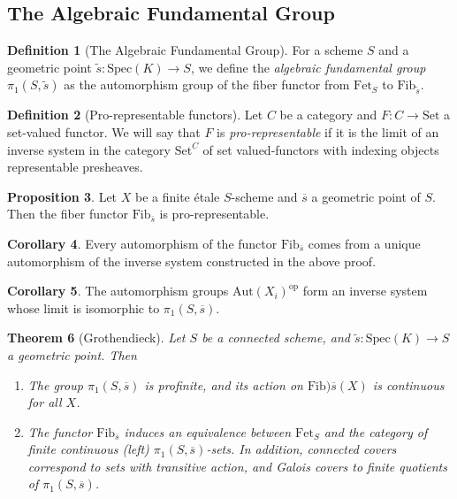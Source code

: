 \documentclass{article}
\newtheorem{theorem}{Theorem}[section]
\theoremstyle{definition}
\newtheorem{corollary}[theorem]{Corollary}
\newtheorem{proposition}[theorem]{Proposition}
\newtheorem{definition}[theorem]{Definition}
\theoremstyle{remark}
\begin{document}
\subsection{The Algebraic Fundamental Group}


\begin{definition}[The Algebraic Fundamental Group]
	For a scheme $S$ and a geometric point $\widetilde{s}: \text{Spec}(K) \to S$, we define the \textit{algebraic fundamental group} $\pi_1(S, \widetilde{s})$ as the automorphism group of the fiber functor from $\text{Fet}_{S}$ to $\text{Fib}_{\widetilde{s}}$.
\end{definition}

\begin{definition}[Pro-representable functors]
	Let $C$ be a category and $F: C \to \text{Set}$ a set-valued functor.
	We will say that $F$ is \textit{pro-representable} if it is the limit of an inverse system in the category $\text{Set}^C$ of set valued-functors with indexing objects representable presheaves.
\end{definition} 

\begin{proposition}
	Let $X$ be a finite \'etale $S$-scheme and $\overline{s}$ a geometric point of $S$.
	Then the fiber functor $\text{Fib}_{\overline{s}}$ is pro-representable.
\end{proposition}

\begin{corollary}
	Every automorphism of the functor $\text{Fib}_{\overline{s}}$ comes from a unique automorphism of the inverse system constructed in the above proof.
\end{corollary}

\begin{corollary}
	The automorphism groups $\text{Aut}(X_i)^{\text{op}}$ form an inverse system whose limit is isomorphic to $\pi_1(S, \overline{s})$.
\end{corollary}

\begin{theorem}[Grothendieck]
	Let $S$ be a connected scheme, and $\widetilde{s}: \text{Spec}(K) \to S$ a geometric point. Then \begin{enumerate} 
		\item The group $\pi_1(S, \overline{s})$ is profinite, and its action on $\text{Fib}){\overline{s}}(X)$ is continuous for all $X$.\\
		\item The functor $\text{Fib}_{\overline{s}}$ induces an equivalence between $\text{Fet}_S$ and the category of finite continuous (left) $\pi_1(S, \overline{s})$-sets.	In addition, connected covers correspond to sets with transitive action, and Galois covers to finite quotients of $\pi_1(S, \overline{s})$.
 \end{enumerate}

 
\end{theorem}
\end{document}
